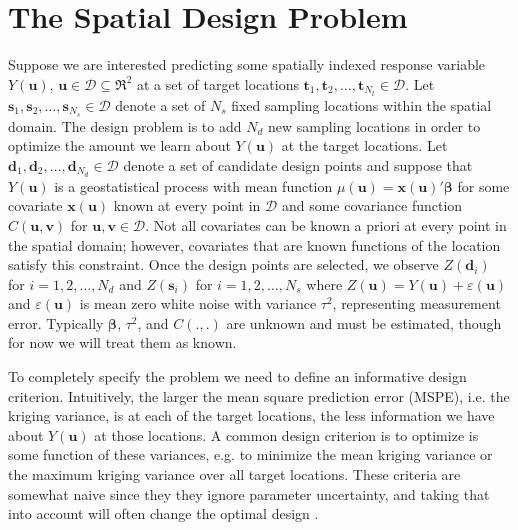 \documentclass[cmbright]{staauth}
\begin{document}
\section{The Spatial Design Problem}\label{sec:spatialdesign}
Suppose we are interested predicting some spatially indexed response variable $Y(\bm{u})$, $\bm{u}\in \mathcal{D}\subseteq \Re^2$ at a set of target locations $\bm{t}_1, \bm{t}_2, \dots, \bm{t}_{N_t}\in\mathcal{D}$. Let $\bm{s}_1, \bm{s}_2, \dots, \bm{s}_{N_s}\in\mathcal{D}$ denote a set of $N_s$ fixed sampling locations within the spatial domain. The design problem is to add $N_d$ new sampling locations in order to optimize the amount we learn about $Y(\bm{u})$ at the target locations. Let $\bm{d}_1, \bm{d}_2, \dots, \bm{d}_{N_d}\in\mathcal{D}$ denote a set of candidate design points and suppose that $Y(\bm{u})$ is a geostatistical process with mean function $\mu(\bm{u})=\bm{x}(\bm{u})'\bm{\beta}$ for some covariate $\bm{x}(\bm{u})$ known at every point in $\mathcal{D}$ and some covariance function $C(\bm{u}, \bm{v})$ for $\bm{u},\bm{v}\in\mathcal{D}$. Not all covariates can be known a priori at every point in the spatial domain; however, covariates that are known functions of the location satisfy this constraint. Once the design points are selected, we observe $Z(\bm{d}_i)$ for $i=1,2,\dots,N_d$ and $Z(\bm{s}_i)$ for $i=1,2,\dots,N_s$ where $Z(\bm{u}) = Y(\bm{u}) + \varepsilon(\bm{u})$ and $\varepsilon(\bm{u})$ is mean zero white noise with variance $\tau^2$, representing measurement error. Typically $\bm{\beta}$, $\tau^2$, and $C(.,.)$ are unknown and must be estimated, though for now we will treat them as known.

To completely specify the problem we need to define an informative design criterion. Intuitively, the larger the mean square prediction error (MSPE), i.e. the kriging variance, is at each of the target locations, the less information we have about $Y(\bm{u})$ at those locations. A common design criterion is to optimize is some function of these variances, e.g. to minimize the mean kriging variance or the maximum kriging variance over all target locations. These criteria are somewhat naive since they they ignore parameter uncertainty, and taking that into account will often change the optimal design \citep{zimmerman2006optimal}.
\end{document}

